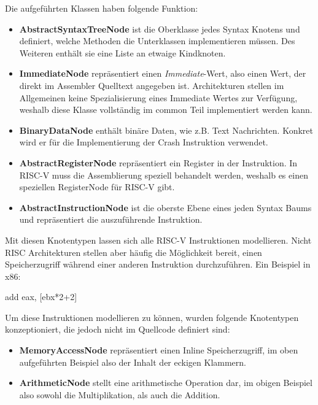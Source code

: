 \label{module-arch-ast-node-types}
Die aufgeführten Klassen haben folgende Funktion:
\begin{itemize}

  \item \textbf{AbstractSyntaxTreeNode} ist die Oberklasse jedes Syntax Knotens
  und definiert, welche Methoden die Unterklassen implementieren müssen. Des
  Weiteren enthält sie eine Liste an etwaige Kindknoten.

  \item \textbf{ImmediateNode} repräsentiert einen \textit{Immediate}-Wert, also
  einen Wert, der direkt im Assembler Quelltext angegeben ist. Architekturen
  stellen im Allgemeinen keine Spezialisierung eines Immediate Wertes zur
  Verfügung, weshalb diese Klasse vollständig im common Teil implementiert
  werden kann.

  \item \textbf{BinaryDataNode} enthält binäre Daten, wie z.B. Text Nachrichten.
  Konkret wird er für die Implementierung der Crash Instruktion verwendet.

	\item \textbf{AbstractRegisterNode} repräsentiert ein Register in der
	Instruktion. In RISC-V muss die Assemblierung speziell behandelt werden,
	weshalb es einen speziellen RegisterNode für RISC-V gibt.

	\item \textbf{AbstractInstructionNode} ist die oberste Ebene eines jeden
	Syntax Baums und repräsentiert die auszuführende Instruktion.

\end{itemize}

Mit diesen Knotentypen lassen sich alle RISC-V Instruktionen modellieren. Nicht
RISC Architekturen stellen aber häufig die Möglichkeit bereit, einen
Speicherzugriff während einer anderen Instruktion durchzuführen. Ein Beispiel in
x86:

\begin{x86}
add eax, [ebx*2+2]
\end{x86}

Um diese Instruktionen modellieren zu können, wurden folgende Knotentypen
konzeptioniert, die jedoch nicht im Quellcode definiert sind:
\begin{itemize}
	\item \textbf{MemoryAccessNode} repräsentiert einen Inline Speicherzugriff,
	im oben aufgeführten Beispiel also der Inhalt der eckigen Klammern.
	\item \textbf{ArithmeticNode} stellt eine arithmetische Operation dar, im
	obigen Beispiel also sowohl die Multiplikation, als auch die Addition.
\end{itemize}

